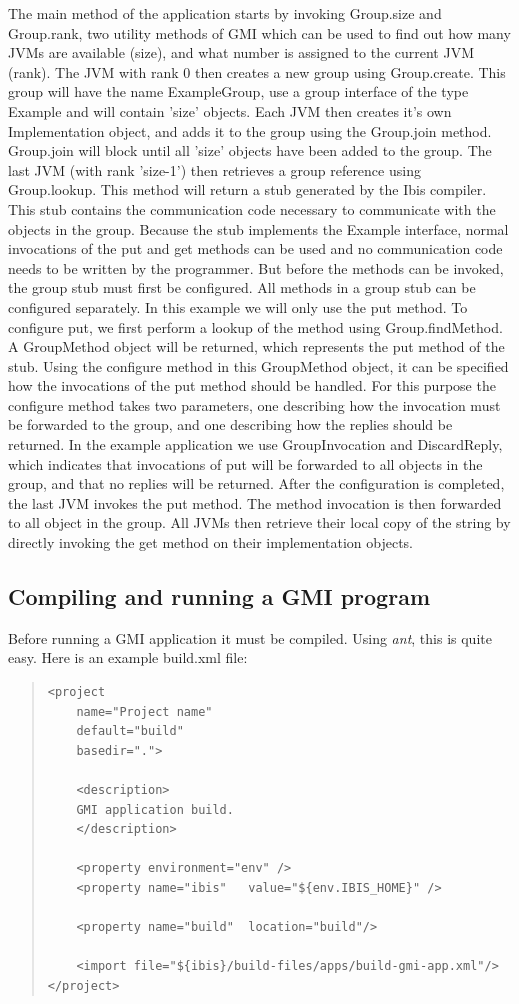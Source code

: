 \documentclass[10pt]{article}
\newcommand{\mysubsection}[1]{\subsection{#1}\label{#1}}
\begin{document}
The main method of the application starts by invoking Group.size and
Group.rank, two utility methods of GMI which can be used to find out
how many JVMs are available (size), and what number is assigned to the
current JVM (rank).  The JVM with rank 0 then creates a new group
using Group.create. This group will have the name ExampleGroup, use a
group interface of the type Example and will contain 'size'
objects. Each JVM then creates it's own Implementation object, and
adds it to the group using the Group.join method. Group.join will
block until all 'size' objects have been added to the group.  The last
JVM (with rank 'size-1') then retrieves a group reference using
Group.lookup. This method will return a stub generated by the Ibis
compiler. This stub contains the communication code necessary to
communicate with the objects in the group. Because the stub implements
the Example interface, normal invocations of the put and get methods
can be used and no communication code needs to be written by the
programmer. But before the methods can be invoked, the group stub must
first be configured.  All methods in a group stub can be configured
separately. In this example we will only use the put method. To
configure put, we first perform a lookup of the method using
Group.findMethod. A GroupMethod object will be returned, which
represents the put method of the stub.  Using the configure method in
this GroupMethod object, it can be specified how the invocations of
the put method should be handled. For this purpose the configure
method takes two parameters, one describing how the invocation must be
forwarded to the group, and one describing how the replies should be
returned. In the example application we use GroupInvocation and
DiscardReply, which indicates that invocations of put will be
forwarded to all objects in the group, and that no replies will be
returned.  After the configuration is completed, the last JVM invokes
the put method. The method invocation is then forwarded to all object
in the group. All JVMs then retrieve their local copy of the string by
directly invoking the get method on their implementation objects.


\mysubsection{Compiling and running a GMI program}

Before running a GMI application it must be compiled.
Using \emph{ant}, this is quite easy. Here is an example build.xml file:

{\small
\begin{quote}
\begin{verbatim}
<project
    name="Project name"
    default="build"
    basedir=".">

    <description>
    GMI application build.
    </description>

    <property environment="env" />
    <property name="ibis"   value="${env.IBIS_HOME}" />

    <property name="build"  location="build"/>

    <import file="${ibis}/build-files/apps/build-gmi-app.xml"/>
</project>
\end{verbatim}
\end{quote}
}
\end{document}
